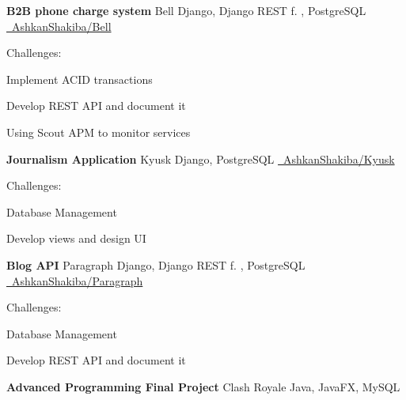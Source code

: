 \documentclass[]{awesome-cv}
\begin{document}
\begin{cventries}
	\cventry
	{\textbf{B2B phone charge system}}
	{Bell}
	{Django, Django REST f. , PostgreSQL}
	{\href{https://github.com/AshkanShakiba/Bell}{\faGithub\ AshkanShakiba/Bell}}
	{\begin{cvitems}
		\vspace{1mm}
		\item[] {\hspace{-9mm} Challenges:}
		\vspace{1mm}
		\item {Implement ACID transactions}
		\vspace{1mm}
		\item {Develop REST API and document it}
		\vspace{1mm}
		\item {Using Scout APM to monitor services}
	\end{cvitems}}
	\vspace{0mm}
	\cventry
	{\textbf{Journalism Application}}
	{Kyusk}
	{Django, PostgreSQL}
	{\href{https://github.com/AshkanShakiba/Kyusk}{\faGithub\ AshkanShakiba/Kyusk}}
	{\begin{cvitems}
		\vspace{1mm}
		\item[] {\hspace{-9mm} Challenges:}
		\vspace{1mm}
		\item {Database Management}
		\vspace{1mm}
		\item {Develop views and design UI}
	\end{cvitems}}
	\vspace{0mm}
	\cventry
	{\textbf{Blog API}}
	{Paragraph}
	{Django, Django REST f. , PostgreSQL}
	{\href{https://github.com/AshkanShakiba/Paragraph}{\faGithub\ AshkanShakiba/Paragraph}}
	{\begin{cvitems}
		\vspace{1mm}
		\item[] {\hspace{-9mm} Challenges:}
		\vspace{1mm}
		\item {Database Management}
		\vspace{1mm}
		\item {Develop REST API and document it}
	\end{cvitems}}
	\vspace{0mm}
	\cventry
	{\textbf{Advanced Programming Final Project}}
	{Clash Royale}
	{Java, JavaFX, MySQL}

\end{cventries}
\end{document}
